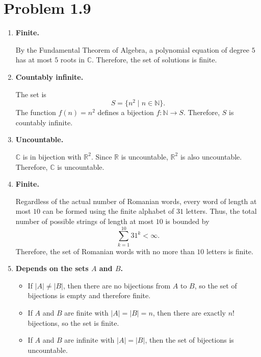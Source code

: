 \documentclass[12pt]{article}
\begin{document}
\section*{Problem 1.9}

\begin{enumerate}[label=\alph*)]

    \item \textbf{Finite.}
    
    By the Fundamental Theorem of Algebra, a polynomial equation of degree
    $5$ has at most $5$ roots in $\mathbb{C}$. Therefore, the set of
    solutions is finite.

    \item \textbf{Countably infinite.}
    
    The set is
    \[
    S = \{n^2 \mid n \in \mathbb{N}\}.
    \]
    The function $f(n) = n^2$ defines a bijection
    $f:\mathbb{N}\to S$. Therefore, $S$ is countably infinite.

    \item \textbf{Uncountable.}
    
    $\mathbb{C}$ is in bijection with $\mathbb{R}^2$. Since $\mathbb{R}$
    is uncountable, $\mathbb{R}^2$ is also uncountable. Therefore,
    $\mathbb{C}$ is uncountable.

    \item \textbf{Finite.}
    
    Regardless of the actual number of Romanian words, every word of
    length at most $10$ can be formed using the finite alphabet of
    $31$ letters. Thus, the total number of possible strings of length
    at most $10$ is bounded by
    \[
    \sum_{k=1}^{10} 31^k < \infty.
    \]
    Therefore, the set of Romanian words with no more than $10$ letters
    is finite.

    \item \textbf{Depends on the sets $A$ and $B$.}
    
    \begin{itemize}
        \item If $|A| \neq |B|$, then there are no bijections from $A$
        to $B$, so the set of bijections is empty and therefore finite.

        \item If $A$ and $B$ are finite with $|A| = |B| = n$, then there
        are exactly $n!$ bijections, so the set is finite.

        \item If $A$ and $B$ are infinite with $|A| = |B|$, then the set
        of bijections is uncountable.
    \end{itemize}


\end{enumerate}
\end{document}
